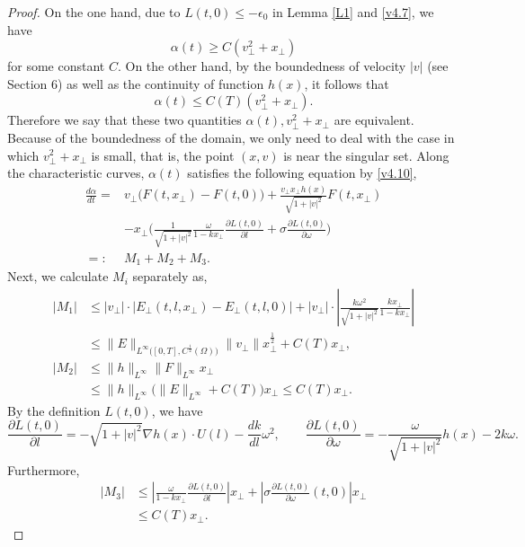 \documentclass[11pt,reqno]{amsart}%
\theoremstyle{definition}
\theoremstyle{remark}
\begin{document}
\begin{proof}
On the one hand, due to $L(t,0)\leq -\epsilon_{0}$ in Lemma \ref{L1} and \eqref{v4.7}, we have $$\alpha (t)\geq C(v^{2}_{\bot}+x_{\bot})$$ for some constant $C$.
On the other hand, by the boundedness of velocity $|v|$ (see  Section 6) as well as the continuity of function $h(x)$, it follows that 
$$\alpha (t)\leq C(T)(v^{2}_{\bot}+x_{\bot}).$$
Therefore we say that these two quantities $\alpha(t), v^{2}_{\bot}+x_{\bot}$ are equivalent.
Because of the boundedness of the domain, we only need to deal with the case in which $v^{2}_{\bot}+x_{\bot}$ is small, that is, the point $(x,v)$ is near the singular set.
Along  the characteristic curves, $\alpha (t)$ satisfies the following equation by \eqref{v4.10},
\begin{align}
\frac{d \alpha}{d t}=&v_{\bot}\Big(F(t,x_{\bot})-F(t,0)\Big)
  +\frac{v_{\bot}x_{\bot}h(x)}{\sqrt{1+|v|^{2}}}F(t,x_{\bot})\nonumber\\
  &-x_{\bot}\Big(\frac{1}{\sqrt{1+|v|^{2}}}\frac{\omega}{1-kx_{\bot}}\frac{\partial L(t,0)}{\partial l}+\sigma \frac{\partial L(t,0)}{\partial \omega}\Big)\nonumber\\
  =:&M_{1}+M_{2}+M_{3}.\nonumber
\end{align}
Next, we calculate $M_{i}$ separately as,
\begin{align}
|M_{1}| &\leq |v_{\bot}|\cdot\big|E_{\bot}(t,l,x_{\bot})-E_{\bot}(t,l,0)\big|+|v_{\bot}|\cdot\left|\frac{k \omega^{2}}{\sqrt{1+|v|^{2}}}\frac{kx_{\bot}}{1-kx_{\bot}}\right|\nonumber\\
&\leq \|E\|_{L^{\infty}\big([0,T],C^{\frac{1}{2}}(\Omega)\big)}\|v_{\bot}\|x^{\frac{1}{2}}_{\bot}+C(T)x_{\bot},\nonumber\\
|M_{2}| &\leq  \|h\|_{L^{\infty}}\|F\|_{L^{\infty}} x_{\bot}\nonumber\\
&\leq  \|h\|_{L^{\infty}}\big(\|E\|_{L^{\infty}}+C(T)\big) x_{\bot}\leq C(T) x_{\bot}. \nonumber
\end{align}
By the definition $L(t,0)$, we have
$$\frac{\partial L(t,0)}{\partial l}=-\sqrt{1+|v|^{2}}\nabla h(x)\cdot U(l)-\frac{d k}{dl}\omega^{2},\qquad
\frac{\partial L(t,0)}{\partial \omega}=-\frac{\omega}{\sqrt{1+|v|^{2}}}h(x)-2k \omega. $$
Furthermore,
\begin{align}
|M_{3}| &\leq |\frac{\omega}{1-kx_{\bot}}\frac{\partial L(t,0)}{\partial l}|x_{\bot}+|\sigma \frac{\partial L(t,0)}{\partial \omega}(t,0)|x_{\bot}\nonumber\\
 &\leq C(T)x_{\bot}.\nonumber
\end{align}

\end{proof}
\end{document}
